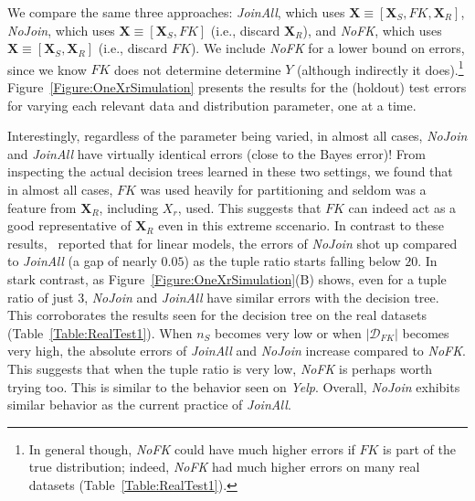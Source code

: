 \documentclass{vldb}
\begin{document}
We compare the same three approaches: \textit{JoinAll}, which uses $\textbf{X} \equiv [\textbf{X}_S, FK, \textbf{X}_R]$, 
\textit{NoJoin}, which uses $\textbf{X} \equiv [\textbf{X}_S, FK]$ (i.e., discard $\textbf{X}_R$), and \textit{NoFK}, 
which uses $\textbf{X} \equiv [\textbf{X}_S, \textbf{X}_R]$ (i.e., discard $FK$).
We include \textit{NoFK} for a lower bound on errors, since we know $FK$ does not determine determine $Y$ (although indirectly it 
does).\footnote{In general though, \textit{NoFK} could have much higher errors if $FK$ is part of the true distribution; indeed, \textit{NoFK} had 
much higher errors on many real datasets (Table~\ref{Table:RealTest1}).}
Figure~\ref{Figure:OneXrSimulation} presents the results for the (holdout) test errors for varying each relevant data and distribution parameter, one at a time.

Interestingly, regardless of the parameter being varied, in almost all cases, \textit{NoJoin} and \textit{JoinAll} have virtually identical errors (close to the Bayes 
error)! From inspecting the actual decision trees learned in these two settings, we found that in almost all cases, $FK$ was used heavily for partitioning and seldom was 
a feature from $\textbf{X}_R$, including $X_r$, used. This suggests that $FK$ can indeed act as a good representative of $\textbf{X}_R$ even in this extreme sccenario. 
In contrast to these results,~\cite{hamlet} reported that for linear models, the errors of \textit{NoJoin} shot up compared to \textit{JoinAll} (a gap of nearly $0.05$)
as the tuple ratio starts falling below $20$. In stark contrast, as Figure~\ref{Figure:OneXrSimulation}(B) shows, even for a tuple ratio of just $3$, \textit{NoJoin} 
and \textit{JoinAll} have similar errors with the decision tree. This corroborates the results seen for the decision tree on the real datasets (Table~\ref{Table:RealTest1}).
When $n_S$ becomes very low or when $|\mathcal{D}_{FK}|$ becomes very high, the absolute errors of \textit{JoinAll} and \textit{NoJoin} increase compared to \textit{NoFK}. 
This suggests that when the tuple ratio is very low, \textit{NoFK} is perhaps worth trying too. This is similar to the behavior seen on \textit{Yelp}. 
Overall, \textit{NoJoin} exhibits similar behavior as the current practice of \textit{JoinAll}.
\end{document}
